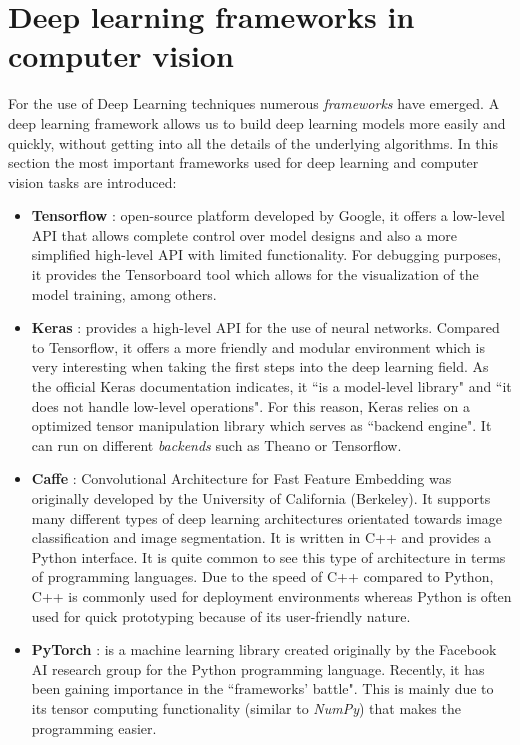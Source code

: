 \section{Deep learning frameworks in computer vision} \label{dl_frameworks}
For the use of Deep Learning techniques numerous \textit{frameworks} have emerged. A deep learning framework allows us to build deep learning models more easily and quickly, without getting into all the details of the underlying algorithms. In this section the most important frameworks used for deep learning and computer vision tasks are introduced:
\begin{itemize}
\item \textbf{Tensorflow} \cite{tensorflow}: open-source platform developed by Google, it offers a low-level API that allows complete control over model designs and also a more simplified high-level API with limited functionality. For debugging purposes, it provides the Tensorboard tool which allows for the visualization of the model training, among others.
\item \textbf{Keras} \cite{keras}: provides a high-level API for the use of neural networks. Compared to Tensorflow, it offers a more friendly and modular environment which is very interesting when taking the first steps into the deep learning field. As the official Keras documentation indicates, it ``is a model-level library" and ``it does not handle low-level operations". For this reason, Keras relies on a optimized tensor manipulation library which serves as ``backend engine". It can run on different \textit{backends} such as Theano or Tensorflow.
\item \textbf{Caffe} \cite{caffe}: Convolutional Architecture for Fast Feature Embedding was originally developed by the University of California (Berkeley). It supports many different types of deep learning architectures orientated towards image classification and image segmentation. It is written in C++ and provides a Python interface. It is quite common to see this type of architecture in terms of programming languages. Due to the speed of C++ compared to Python, C++ is commonly used for deployment environments whereas Python is often used for quick prototyping because of its user-friendly nature.
\item \textbf{PyTorch} \cite{pytorch}: is a machine learning library created originally by the Facebook AI research group for the Python programming language. Recently, it has been gaining importance in the ``frameworks' battle". This is mainly due to its tensor computing functionality (similar to \textit{NumPy}) that makes the programming easier.
\end{itemize}




